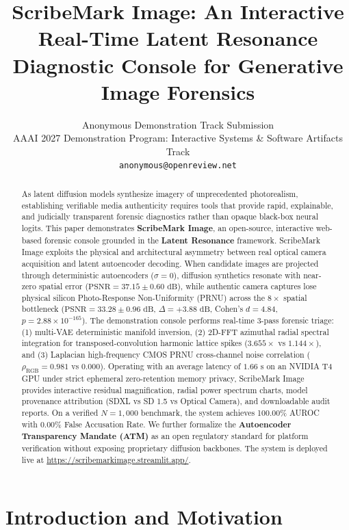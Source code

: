 \documentclass[letterpaper]{article}
\title{ScribeMark Image: An Interactive Real-Time Latent Resonance Diagnostic Console for Generative Image Forensics}
\author{
    Anonymous Demonstration Track Submission\\
    AAAI 2027 Demonstration Program: Interactive Systems \& Software Artifacts Track\\
    \texttt{anonymous@openreview.net}
}
\begin{document}
\maketitle

\begin{abstract}
As latent diffusion models synthesize imagery of unprecedented photorealism, establishing verifiable media authenticity requires tools that provide rapid, explainable, and judicially transparent forensic diagnostics rather than opaque black-box neural logits. This paper demonstrates \textbf{ScribeMark Image}, an open-source, interactive web-based forensic console grounded in the \textbf{Latent Resonance} framework. ScribeMark Image exploits the physical and architectural asymmetry between real optical camera acquisition and latent autoencoder decoding. When candidate images are projected through deterministic autoencoders ($\sigma = 0$), diffusion synthetics resonate with near-zero spatial error ($\text{PSNR} = 37.15 \pm 0.60\text{ dB}$), while authentic camera captures lose physical silicon Photo-Response Non-Uniformity (PRNU) across the $8\times$ spatial bottleneck ($\text{PSNR} = 33.28 \pm 0.96\text{ dB}$, $\Delta = +3.88\text{ dB}$, Cohen's $d = 4.84$, $p = 2.88 \times 10^{-165}$). The demonstration console performs real-time 3-pass forensic triage: (1) multi-VAE deterministic manifold inversion, (2) 2D-FFT azimuthal radial spectral integration for transposed-convolution harmonic lattice spikes ($3.655\times$ vs $1.144\times$), and (3) Laplacian high-frequency CMOS PRNU cross-channel noise correlation ($\rho_{\text{RGB}} = 0.981$ vs $0.000$). Operating with an average latency of $1.66\text{ s}$ on an NVIDIA T4 GPU under strict ephemeral zero-retention memory privacy, ScribeMark Image provides interactive residual magnification, radial power spectrum charts, model provenance attribution (SDXL vs SD 1.5 vs Optical Camera), and downloadable audit reports. On a verified $N=1,000$ benchmark, the system achieves 100.00\% AUROC with 0.00\% False Accusation Rate. We further formalize the \textbf{Autoencoder Transparency Mandate (ATM)} as an open regulatory standard for platform verification without exposing proprietary diffusion backbones. The system is deployed live at \url{https://scribemarkimage.streamlit.app/}.
\end{abstract}

\section{Introduction and Motivation}
\label{sec:intro}
\end{document}
